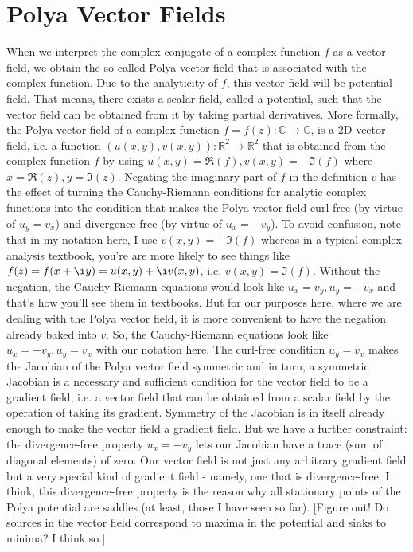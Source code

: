 \documentclass[12pt]{article}
\begin{document}
\section{Polya Vector Fields}
When we interpret the complex conjugate of a complex function $f$ as a vector field, we obtain the so called Polya vector field that is associated with the complex function. Due to the analyticity of $f$, this vector field will be potential field. That means, there exists a scalar field, called a potential, such that the vector field can be obtained from it by taking partial derivatives. More formally, the Polya vector field of a complex function $f = f(z): \mathbb{C} \rightarrow \mathbb{C}$, is a 2D vector field, i.e. a function $(u(x,y), v(x,y)): \mathbb{R}^2 \rightarrow \mathbb{R}^2$ that is obtained from the complex function $f$ by using $u(x,y) = \Re(f), v(x,y) = -\Im(f)$ where $x = \Re(z), y = \Im(z)$. Negating the imaginary part of $f$ in the definition $v$ has the effect of turning the Cauchy-Riemann conditions for analytic complex functions into the condition that makes the Polya vector field curl-free (by virtue of $u_y = v_x$) and divergence-free (by virtue of $u_x = - v_y$). To avoid confusion, note that in my notation here, I use $v(x,y) = -\Im(f)$ whereas in a typical complex analysis textbook, you're are more likely to see things like $f(z) = f(x + \i y) = u(x,y) + \i v(x,y)$, i.e. $v(x,y) = \Im(f)$. Without the negation, the Cauchy-Riemann equations would look like $u_x = v_y, u_y = -v_x$ and that's how you'll see them in textbooks. But for our purposes here, where we are dealing with the Polya vector field, it is more convenient to have the negation already baked into $v$. So, the Cauchy-Riemann equations look like $u_x = -v_y, u_y = v_x$ with our notation here. The curl-free condition $u_y = v_x$ makes the Jacobian of the Polya vector field symmetric and in turn, a symmetric Jacobian is a necessary and sufficient condition for the vector field to be a gradient field, i.e. a vector field that can be obtained from a scalar field by the operation of taking its gradient. Symmetry of the Jacobian is in itself already enough to make the vector field a gradient field. But we have a further constraint: the divergence-free property $u_x = -v_y$ lets our Jacobian have a trace (sum of diagonal elements) of zero. Our vector field is not just any arbitrary gradient field but a very special kind of gradient field - namely, one that is divergence-free. I think, this divergence-free property is the reason why all stationary points of the Polya potential are saddles (at least, those I have seen so far). [Figure out! Do sources in the vector field correspond to maxima in the potential and sinks to minima? I think so.]
\end{document}
